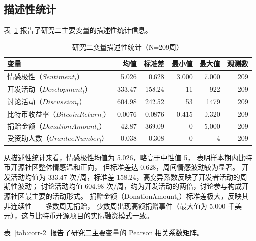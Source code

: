 \documentclass[
    type = master, %
    degree = professional,        %
    decl-page,  %
    twoside,                %
    fontset = fandol %
  ]{njuthesis}
\begin{document}
\subsection{描述性统计}

表~\ref{tab:desc-stats-2} 报告了研究二主要变量的描述性统计信息。

\begin{table}[htbp]
    \centering
    \small
    \caption{研究二变量描述性统计（N=209周）}
    \label{tab:desc-stats-2}
    \begin{tabularx}{\textwidth}{Xrrrrr}
        \toprule
        变量 & 均值 & 标准差 & 最小值 & 最大值 & 观测数 \\
        \midrule
        情感极性（$Sentiment_t$） & 5.026 & 0.628 & 3.000 & 7.000 & 209 \\
        开发活动（$Development_t$）      & 333.47 & 158.24 & 11 & 922 & 209 \\
        讨论活动（$Discussion_t$）   & 604.98 & 242.52 & 53 & 1479 & 209 \\
        比特币收益率（$BitcoinReturn_t$）    & 0.0076 & 0.0876 & $-$0.415 & 0.320 & 209 \\
        捐赠金额（$DonationAmount_t$）  & 42.87 & 369.09 & 0 & 5{,}000 & 209 \\
        受资助人数（$GranteeNumber_t$）     & 0.038 & 0.308 & 0 & 4 & 209 \\
        \bottomrule
    \end{tabularx}
\end{table}

从描述性统计来看，情感极性均值为 5.026，略高于中性值 5，
表明样本期内比特币开源社区整体情感温和正向，
但标准差达 0.628，周间情感波动较为显著。
开发活动均值为 333.47 次/周，标准差 158.24，高变异系数反映了开发者活动的周期性波动；
讨论活动均值 604.98 次/周，约为开发活动的两倍，讨论参与构成开源社区最主要的活动形式。
捐赠金额（$\text{DonationAmount}_t$）标准差极大，反映其非连续性——多数周无捐赠，
少数周出现高额捐赠事件（最大值为 5,000 千美元），这与比特币开源项目的实际融资模式一致。

表~\ref{tab:corr-2} 报告了研究二主要变量的 Pearson 相关系数矩阵。
\end{document}
